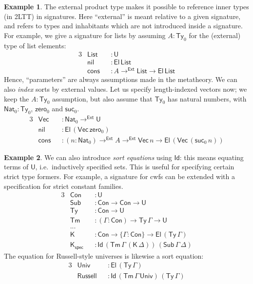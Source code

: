 \documentclass[12pt,a4paper,twoside,openany]{book}
\theoremstyle{remark}
\theoremstyle{definition}
\newtheorem{myexample}{Example}
\theoremstyle{theorem}
\newcommand{\ms}[1]{\mathsf{#1}}
\newcommand{\zero}{\ms{zero}}
\newcommand{\suc}{\ms{suc}}
\newcommand{\Ty}{\mathsf{Ty}}
\newcommand{\U}{\mathsf{U}}
\newcommand{\El}{\mathsf{El}}
\newcommand{\Id}{\mathsf{Id}}
\newcommand{\toe}{\to^{\ms{Ext}}}
\newcommand{\Nat}{\ms{Nat}}
\begin{document}
\begin{myexample}
The external product type makes it possible to reference inner types (in 2LTT)
in signatures. Here ``external'' is meant relative to a given signature, and
refers to types and inhabitants which are not introduced inside a signature.
For example, we give a signature for lists by assuming $A : \Ty_0$ for the
(external) type of list elements:
\begin{alignat*}{3}
  &\ms{List} &&: \U\\
  &\ms{nil}  &&: \El\,\ms{List}\\
  &\ms{cons} &&: A \toe \ms{List} \to \El\,\ms{List}
\end{alignat*}
Hence, ``parameters'' are always assumptions made in the metatheory. We can
also \emph{index} sorts by external values. Let us specify length-indexed vectors
now; we keep the $A : \Ty_0$ assumption, but also assume that $\Ty_0$ has
natural numbers, with $\Nat_0 : \Ty_0$, $\zero_0$ and $\suc_0$.
\begin{alignat*}{3}
  &\ms{Vec}  &&: \Nat_0 \toe \U \\
  &\ms{nil}  &&: \El\,(\ms{Vec}\,\zero_0)\\
  &\ms{cons} &&: (n : \Nat_0) \toe A \toe \ms{Vec}\,n \to \El\,(\ms{Vec}\,(\suc_0\,n))
\end{alignat*}
\end{myexample}

\begin{myexample}
We can also introduce \emph{sort equations} using $\Id$: this means equating
terms of $\U$, i.e.\ inductively specified sets. This is useful for specifying
certain strict type formers. For example, a signature for cwfs can be extended with
a specification for strict constant families.
\begin{alignat*}{3}
  & \ms{Con}     &&: \U\\
  & \ms{Sub}     &&: \ms{Con} \to \ms{Con} \to \U \\
  & \ms{Ty}      &&: \ms{Con} \to \U\\
  & \ms{Tm}      &&: (\Gamma : \ms{Con}) \to \ms{Ty}\,\Gamma \to \U\\
  & ...          &&\\
  & \ms{K}       &&: \ms{Con} \to \{\Gamma : \ms{Con}\} \to \El\,(\ms{Ty}\,\Gamma)\\
  & \ms{K_{spec}} &&: \Id\,(\ms{Tm}\,\Gamma\,(\ms{K}\,\Delta))\,(\ms{Sub}\,\Gamma\,\Delta)
\end{alignat*}
The equation for Russell-style universes is likewise a sort equation:
\begin{alignat*}{3}
  &\ms{Univ}    &&: \El\,(\ms{Ty}\,\Gamma)\\
  &\ms{Russell} &&: \Id\,(\ms{Tm}\,\Gamma\,\ms{Univ})\,(\ms{Ty}\,\Gamma)
\end{alignat*}
\end{myexample}
\end{document}
